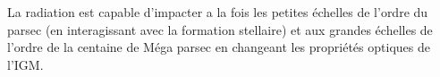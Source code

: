 La radiation est capable d'impacter a la fois les petites échelles de l'ordre du parsec (en interagissant avec la formation stellaire)
et aux grandes échelles de l'ordre de la centaine de Méga parsec en changeant les propriétés optiques de l'\ac{IGM}.




%



